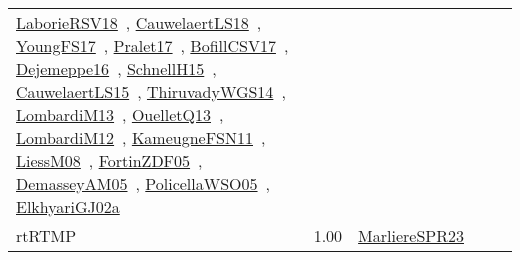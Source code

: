 {\begin{longtable}{p{3cm}r>{\raggedright\arraybackslash}p{6cm}>{\raggedright\arraybackslash}p{6cm}>{\raggedright\arraybackslash}p{8cm}}
\href{../works/LaborieRSV18.pdf}{LaborieRSV18}~\cite{LaborieRSV18}, \href{../works/CauwelaertLS18.pdf}{CauwelaertLS18}~\cite{CauwelaertLS18}, \href{../works/YoungFS17.pdf}{YoungFS17}~\cite{YoungFS17}, \href{../works/Pralet17.pdf}{Pralet17}~\cite{Pralet17}, \href{../works/BofillCSV17.pdf}{BofillCSV17}~\cite{BofillCSV17}, \href{../works/Dejemeppe16.pdf}{Dejemeppe16}~\cite{Dejemeppe16}, \href{../works/SchnellH15.pdf}{SchnellH15}~\cite{SchnellH15}, \href{../works/CauwelaertLS15.pdf}{CauwelaertLS15}~\cite{CauwelaertLS15}, \href{../works/ThiruvadyWGS14.pdf}{ThiruvadyWGS14}~\cite{ThiruvadyWGS14}, \href{../works/LombardiM13.pdf}{LombardiM13}~\cite{LombardiM13}, \href{../works/OuelletQ13.pdf}{OuelletQ13}~\cite{OuelletQ13}, \href{../works/LombardiM12.pdf}{LombardiM12}~\cite{LombardiM12}, \href{../works/KameugneFSN11.pdf}{KameugneFSN11}~\cite{KameugneFSN11}, \href{../works/LiessM08.pdf}{LiessM08}~\cite{LiessM08}, \href{../works/FortinZDF05.pdf}{FortinZDF05}~\cite{FortinZDF05}, \href{../works/DemasseyAM05.pdf}{DemasseyAM05}~\cite{DemasseyAM05}, \href{../works/PolicellaWSO05.pdf}{PolicellaWSO05}~\cite{PolicellaWSO05}, \href{../works/ElkhyariGJ02a.pdf}{ElkhyariGJ02a}~\cite{ElkhyariGJ02a}\\
\index{rtRTMP}\index{Classification!rtRTMP}rtRTMP &  1.00 & \href{../works/MarliereSPR23.pdf}{MarliereSPR23}~\cite{MarliereSPR23} &  & \\

\end{longtable}}
